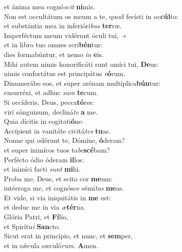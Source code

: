 \oddverse et ánima mea cognó\textit{scit} \textbf{ni}mis.\\
\evenverse Non est occultátum os meum a te, quod fecísti in oc\textbf{cúl}to:~\*\\
\evenverse et substántia mea in inferióri\textit{bus} \textbf{ter}ræ.\\
\oddverse Imperféctum meum vidérunt óculi tui,~+\\
\oddverse  et in libro tuo omnes scri\textbf{bén}tur:~\*\\
\oddverse dies formabúntur, et nemo \textit{in} \textbf{e}is.\\
\evenverse Mihi autem nimis honorificáti sunt amíci tui, \textbf{De}us:~\*\\
\evenverse nimis confortátus est principátus \textit{e}\textbf{ó}rum.\\
\oddverse Dinumerábo eos, et super arénam multiplica\textbf{bún}tur:~\*\\
\oddverse exsurréxi, et adhuc \textit{sum} \textbf{te}cum.\\
\evenverse Si occíderis, Deus, pecca\textbf{tó}res:~\*\\
\evenverse viri sánguinum, decliná\textit{te} \textbf{a} me.\\
\oddverse Quia dícitis in cogitati\textbf{ó}ne:~\*\\
\oddverse Accípient in vanitáte civitá\textit{tes} \textbf{tu}as.\\
\evenverse Nonne qui odérunt te, Dómine, \textbf{ó}deram?~\*\\
\evenverse et super inimícos tuos ta\textit{be}\textbf{scé}bam?\\
\oddverse Perfécto ódio óderam \textbf{il}los:~\*\\
\oddverse et inimíci facti \textit{sunt} \textbf{mi}hi.\\
\evenverse Proba me, Deus, et scito cor \textbf{me}um:~\*\\
\evenverse intérroga me, et cognósce sémi\textit{tas} \textbf{me}as.\\
\oddverse Et vide, si via iniquitátis in \textbf{me} est:~\*\\
\oddverse et deduc me in via \textit{æ}\textbf{tér}na.\\
\evenverse Glória Patri, et \textbf{Fí}lio,~\*\\
\evenverse et Spirítu\textit{i} \textbf{San}cto.\\
\oddverse Sicut erat in princípio, et nunc, et \textbf{sem}per,~\*\\
\oddverse et in sǽcula sæculó\textit{rum}. \textbf{A}men.\\
